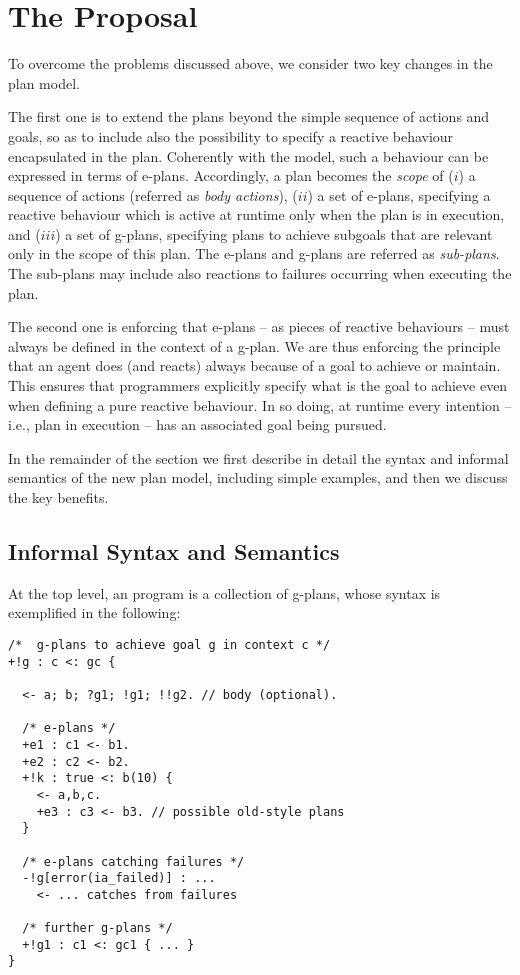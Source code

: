 \section{The {\aser} Proposal}
\label{sec:proposal}

To overcome the problems discussed above, we consider two key changes in the plan model. 

%
% 
%
The first one is to extend the plans beyond the simple sequence of actions and goals, so as to include also the possibility to specify a reactive behaviour encapsulated in the plan.
%
Coherently with the {\asl} model, such a behaviour can be expressed in terms of e-plans.
%
Accordingly, a plan becomes the \emph{scope} of ($i$) a sequence of actions (referred as \emph{body actions}), ($ii$) a set of e-plans, specifying a reactive behaviour which is active at runtime only when the plan is in execution, and ($iii$) a set of g-plans, specifying plans to achieve subgoals that are relevant only in the scope of this plan. The e-plans and g-plans are referred as \emph{sub-plans}.
%
The sub-plans may include also reactions to failures occurring when executing the plan.

%
%
%
The second one is enforcing that e-plans -- as pieces of reactive behaviours -- must always be defined in the context of a g-plan. We are thus  enforcing the principle that an agent does (and reacts) always because of a goal to achieve or maintain.
%
This ensures that programmers explicitly specify what is the goal to achieve even when defining a pure reactive behaviour. 
%
In so doing, at runtime every intention -- i.e., plan in execution -- has an associated goal being pursued.

In the remainder of the section we first describe in detail the syntax and informal semantics of the new plan model, including simple examples, and then we discuss the key benefits. 

\subsection{Informal Syntax and Semantics}

At the top level, an {\aser} program is a collection of g-plans, whose syntax is exemplified in the following:
%
%
{\small
\begin{verbatim}
/*  g-plans to achieve goal g in context c */
+!g : c <: gc { 

  <- a; b; ?g1; !g1; !!g2. // body (optional).

  /* e-plans */
  +e1 : c1 <- b1.	
  +e2 : c2 <- b2.
  +!k : true <: b(10) {
    <- a,b,c.
    +e3 : c3 <- b3. // possible old-style plans
  }	
  
  /* e-plans catching failures */
  -!g[error(ia_failed)] : ...
    <- ... catches from failures 

  /* further g-plans */
  +!g1 : c1 <: gc1 { ... }
}
\end{verbatim}}

